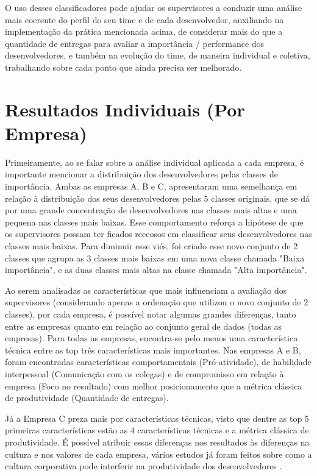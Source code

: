 O uso desses classificadores pode ajudar os supervisores a conduzir uma análise mais coerente do perfil do seu time e de cada desenvolvedor, auxiliando na implementação da prática mencionada acima, de considerar mais do que a quantidade de entregas para avaliar a importância / performance dos desenvolvedores, e também na evolução do time, de maneira individual e coletiva, trabalhando sobre cada ponto que ainda precisa ser melhorado.

\section{Resultados Individuais (Por Empresa)}


Primeiramente, ao se falar sobre a análise individual aplicada a cada empresa, é importante mencionar a distribuição dos desenvolvedores pelas classes de importância. Ambas as empresas A, B e C, apresentaram uma semelhança em relação à distribuição dos seus desenvolvedores pelas 5 classes originais, que se dá por uma grande concentração de desenvolvedores nas classes mais altas e uma pequena nas classes mais baixas. Esse comportamento reforça a hipótese de que os supervisores possam ter ficados receosos em classificar seus desenvolvedores nas classes mais baixas. Para diminuir esse viés, foi criado esse novo conjunto de 2 classes que agrupa as 3 classes mais baixas em uma nova classe chamada "Baixa importância", e as duas classes mais altas na classe chamada "Alta importância".


Ao serem analisadas as características que mais influenciam a avaliação dos supervisores (considerando apenas a ordenação que utilizou o novo conjunto de 2 classes), por cada empresa, é possível notar algumas grandes diferenças, tanto entre as empresas quanto em relação ao conjunto geral de dados (todas as empresas). Para todas as empresas, encontra-se pelo menos uma característica técnica entre as top três características mais importantes. Nas empresas A e B, foram encontradas características comportamentais (Pró-atividade), de habilidade interpessoal (Comunicação com os colegas) e de compromisso em relação à empresa (Foco no resultado) com melhor posicionamento que a métrica clássica de produtividade (Quantidade de entregas).

Já a Empresa C preza mais por características técnicas, visto que dentre as top 5 primeiras características estão as 4 características técnicas e a métrica clássica de produtividade. É possível atribuir essas diferenças nos resultados às diferenças na cultura e nos valores de cada empresa, vários estudos já foram feitos sobre como a cultura corporativa pode interferir na produtividade dos desenvolvedores \cite{Edmans2011,Jones2000,Scudder1991,AgrellA.andGustafson1994,Guzzo1988,McLean1996,Turcotte2004}.

